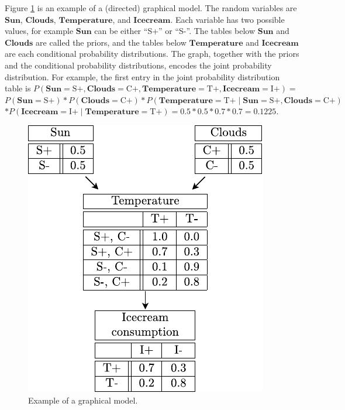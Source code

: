 Figure \ref{fig:Example-of-a-graphical-model} is an example of a
(directed) graphical model. The random variables are \textbf{$\mathbf{Sun}$},
$\mathbf{Clouds}$, \textbf{$\mathbf{Temperature}$}, and \textbf{$\mathbf{Icecream}$}.
Each variable has two possible values, for example $\mathbf{Sun}$
can be either ``S+'' or ``S-''. The tables below $\mathbf{Sun}$
and $\mathbf{Clouds}$ are called the priors, and the tables below
$\mathbf{Temperature}$ and $\mathbf{Icecream}$ are each conditional
probability distributions. The graph, together with the priors and
the conditional probability distributions, encodes the joint probability
distribution. For example, the first entry in the joint probability
distribution table is $P(\mathbf{Sun}=\mbox{S+},\mathbf{Clouds}=\mbox{C+},\mathbf{Temperature}=\mbox{T+},\mathbf{Icecream}=\mbox{I+})=$$P(\mathbf{Sun}=\mbox{S+})*P(\mathbf{Clouds}=\mbox{C+})*P(\mathbf{Temperature}=\mbox{T+}\mid\mathbf{Sun}=\mbox{S+},\mathbf{Clouds}=\mbox{C+})$$*P(\mathbf{Icecream}=\mbox{I+}\mid\mathbf{Temperature}=\mbox{T+})$$=0.5*0.5*0.7*0.7=0.1225.$
\begin{figure}
\begin{centering}
\includegraphics{images/graphical-model-example}
\par\end{centering}
\caption[Example of a graphical model.]{\label{fig:Example-of-a-graphical-model}Example of a graphical model. }
\end{figure}

